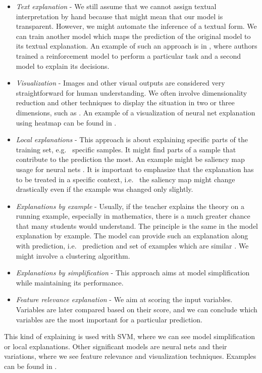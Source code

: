 \begin{itemize}
    \itemsep0em 
    \item \emph{Text explanation} - We still assume that we cannot assign textual interpretation by hand because that might mean that our model is transparent. However, we might automate the inference of a textual form. We can train another model which maps the prediction of the original model to its textual explanation. An example of such an approach is in \cite{Krening2017}, where authors trained a reinforcement model to perform a particular task and a second model to explain its decisions.
    \item \emph{Visualization} - Images and other visual outputs are considered very straightforward for human understanding. We often involve dimensionality reduction and other techniques to display the situation in two or three dimensions, such as \cite{Pearson1901}. An example of a visualization of neural net explanation using heatmap can be found in \cite{Zeiler2013}.
    \item \emph{Local explanations} - This approach is about explaining specific parts of the training set, e.g. \ specific samples. It might find parts of a sample that contribute to the prediction the most. An example might be saliency map usage for neural nets \cite{Simonyan2014}. It is important to emphasize that the explanation has to be treated in a specific context, i.e. \ the saliency map might change drastically even if the example was changed only slightly.
    \item \emph{Explanations by example} - Usually, if the teacher explains the theory on a running example, especially in mathematics, there is a much greater chance that many students would understand. The principle is the same in the model explanation by example. The model can provide such an explanation along with prediction, i.e. \ prediction and set of examples which are similar  \cite{Caruana1999}. We might involve a clustering algorithm.
    \item \emph{Explanations by simplification} - This approach aims at model simplification while maintaining its performance.
    \item \emph{Feature relevance explanation} - We aim at scoring the input variables. Variables are later compared based on their score, and we can conclude which variables are the most important for a particular prediction.
\end{itemize}

This kind of explaining is used with SVM, where we can see model simplification or local explanations. Other significant models are neural nets and their variations, where we see feature relevance and visualization techniques. Examples can be found in \cite{Arrieta2019}.

